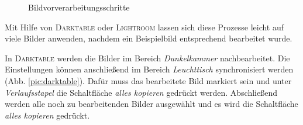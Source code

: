 \documentclass{article}
\begin{document}
\begin{figure}[htbp]
	\centering
	\caption{Bildvorverarbeitungsschritte}
\end{figure}

Mit Hilfe von \textsc{Darktable} oder \textsc{Lightroom} lassen sich diese Prozesse leicht auf viele Bilder anwenden, nachdem ein Beispielbild entsprechend bearbeitet wurde.

In \textsc{Darktable} werden die Bilder im Bereich \textit{Dunkelkammer} nachbearbeitet. Die Einstellungen können anschließend im Bereich \textit{Leuchttisch} synchronisiert werden (Abb. \ref{pic:darktable}). Dafür muss das bearbeitete Bild markiert sein und unter \textit{Verlaufsstapel} die Schaltfläche \textit{alles kopieren} gedrückt werden. Abschließend werden alle noch zu bearbeitenden Bilder ausgewählt und es wird die Schaltfläche \textit{alles kopieren} gedrückt.
\end{document}
